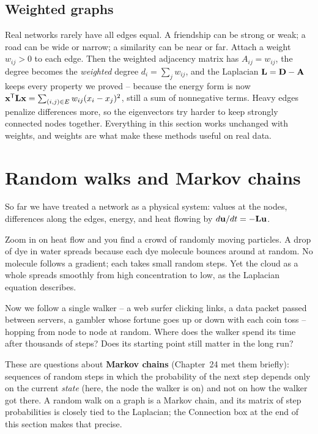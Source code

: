 \subsection{Weighted graphs}

Real networks rarely have all edges equal. A friendship can be strong or weak; a road can
be wide or narrow; a similarity can be near or far. Attach a weight $w_{ij} > 0$ to each
edge. Then the weighted adjacency matrix has $A_{ij} = w_{ij}$, the degree becomes the
\emph{weighted} degree $d_i = \sum_j w_{ij}$, and the Laplacian $\mathbf{L} = \mathbf{D}-\mathbf{A}$
keeps every property we proved -- because the energy form is now
$\mathbf{x}^{\mathsf{T}}\mathbf{L}\mathbf{x} = \sum_{(i,j)\in E} w_{ij}(x_i - x_j)^2$, still a sum of
nonnegative terms. Heavy edges penalize differences more, so the eigenvectors try harder to
keep strongly connected nodes together. Everything in this section works unchanged with
weights, and weights are what make these methods useful on real data.

\section{Random walks and Markov chains}
\label{ch35:markov}

So far we have treated a network as a physical system: values at the nodes, differences
along the edges, energy, and heat flowing by $d\mathbf{u}/dt = -\mathbf{L}\mathbf{u}$.

Zoom in on heat flow and you find a crowd of randomly moving particles. A drop of dye in
water spreads because each dye molecule bounces around at random. No molecule follows a
gradient; each takes small random steps. Yet the cloud as a whole spreads smoothly from high
concentration to low, as the Laplacian equation describes.

Now we follow a single walker -- a web surfer clicking links, a data packet passed between
servers, a gambler whose fortune goes up or down with each coin toss -- hopping from node
to node at random. Where does the walker spend its time after thousands of steps? Does its
starting point still matter in the long run?

These are questions about \textbf{Markov chains} (Chapter~24 met them briefly): sequences of
random steps in which the probability of the next step depends only on the current
\emph{state} (here, the node the walker is on) and not on how the walker got there. A random
walk on a graph is a Markov chain, and its matrix of step probabilities is closely tied to
the Laplacian; the Connection box at the end of this section makes that precise.

